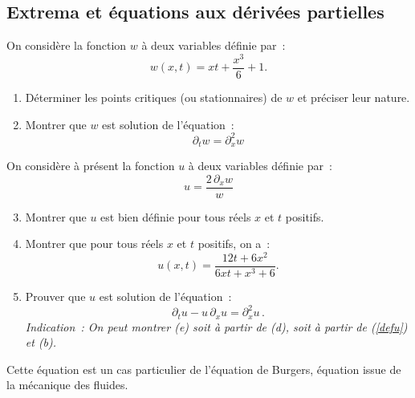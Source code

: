 \subsection{Extrema et équations aux dérivées partielles}


\begin{exo}
    On considère la fonction $w$ à deux variables définie par~:
    $$
        w(x,t) = xt + \frac{x^3}{6} +1.
    $$
    \begin{enumerate}
        \item Déterminer les points critiques (ou stationnaires) de $w$ et préciser leur nature.
        \item Montrer que $w$ est solution de l'équation~:
        $$
            \partial_t w = \partial^2_x w
        $$
    \end{enumerate}

    \noindent On considère à présent la fonction $u$ à deux variables définie par~:
    \begin{equation}
        u = \frac{2\, \partial_x w}{w} \label{defu}
    \end{equation}

    \begin{enumerate}\setcounter{enumi}{2}
        \item Montrer que $u$ est bien définie pour tous réels $x$ et $t$ positifs.
        \item Montrer que pour tous réels $x$ et $t$ positifs, on a~:
        $$
            u(x,t) = \frac{12t+6x^2}{6xt+x^3+6}.
        $$
        \item Prouver que $u$ est solution de l'équation~:
        $$
            \partial_t u - u\,\partial_x u = \partial^2_x u\,.
        $$
        \textit{Indication~: On peut montrer (e) soit à partir de (d), soit à partir de (\ref{defu}) et (b).}
    \end{enumerate}
    Cette équation est un cas particulier de l'équation de Burgers, équation issue de la mécanique des fluides.
\end{exo}

